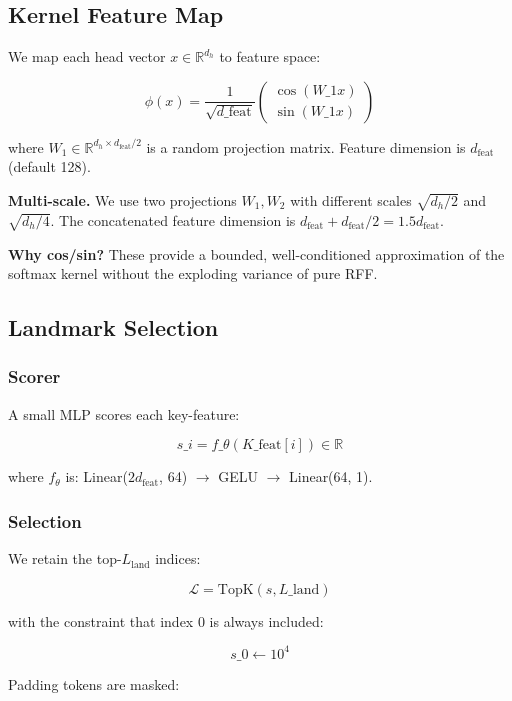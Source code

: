 \subsection{Kernel Feature Map}

We map each head vector $x \in \mathbb{R}^{d_h}$ to feature space:

\[
\phi(x) = \frac{1}{\sqrt{d\_\text{feat}}} \begin{pmatrix} \cos(W\_1 x) \\ \sin(W\_1 x) \end{pmatrix}
\tag{4.1}
\]

where $W_1 \in \mathbb{R}^{d_h \times d_\text{feat}/2}$ is a random 
projection matrix. Feature dimension is $d_\text{feat}$ (default 128).

\textbf{Multi-scale.} We use two projections $W_1, W_2$ with different scales 
$\sqrt{d_h/2}$ and $\sqrt{d_h/4}$. The concatenated feature dimension is 
$d_\text{feat} + d_\text{feat}/2 = 1.5 d_\text{feat}$.

\textbf{Why cos/sin?} These provide a bounded, well-conditioned approximation 
of the softmax kernel without the exploding variance of pure RFF.

\subsection{Landmark Selection}

\subsubsection{Scorer}

A small MLP scores each key-feature:

\[
s\_i = f\_\theta(K\_\text{feat}[i]) \in \mathbb{R}
\tag{4.2}
\]

where $f_\theta$ is: Linear($2 d_\text{feat}$, 64) $\to$ GELU $\to$ Linear(64, 1).

\subsubsection{Selection}

We retain the top-$L_\text{land}$ indices:

\[
\mathcal{L} = \text{TopK}(s, L\_\text{land})
\tag{4.3}
\]

with the constraint that index 0 is always included:

\[
s\_0 \leftarrow 10^4
\tag{4.4}
\]

Padding tokens are masked:

